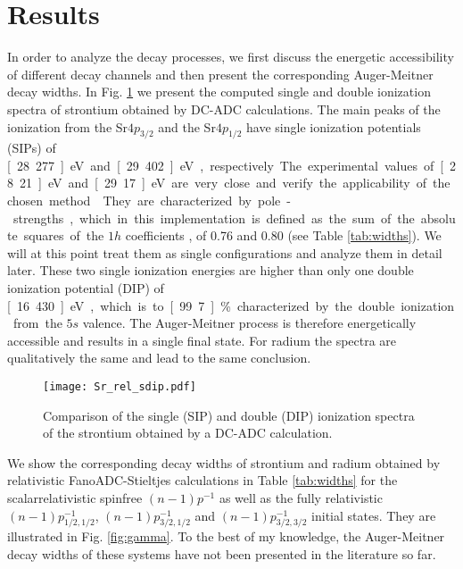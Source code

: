 \section{Results}
\label{section:results}

In order to analyze the decay processes, we first discuss the energetic
accessibility of different decay channels and then present the corresponding
Auger-Meitner decay widths.
In Fig. \ref{fig:sdip} we present the computed
single and double ionization spectra
of strontium obtained by DC-ADC calculations. The main peaks of the
ionization
from the Sr$4p_{3/2}$ and the Sr$4p_{1/2}$ have single ionization potentials (SIPs)
of \unit[28.277]{eV} and \unit[29.402]{eV}, respectively. The experimental
values of \unit[28.21]{eV} and \unit[29.17]{eV} are very close and
{verify}
the applicability
of the chosen method \cite{Schmitz76}.
They are characterized by pole-strengths, which in this implementation
is defined as
the sum of the absolute squares of the $1h$ coefficients
\cite{Trofimov05}, of 0.76 and 0.80
(see Table \ref{tab:widths}). We will at this point treat them as single
configurations and analyze them in detail later.
These two single ionization energies are higher
than only one double ionization potential (DIP) of \unit[16.430]{eV},
which is to \unit[99.7]{\%} characterized by the double ionization from
the $5s$ valence. The Auger-Meitner process is therefore energetically accessible and
results in a single final state.
For radium the spectra are qualitatively the same and
lead to the same conclusion.

\begin{figure}[h]
 \centering
 \texttt{[image: Sr\_rel\_sdip.pdf]}
 \caption{Comparison of the single (SIP) and double (DIP) ionization spectra
          of the strontium obtained by a DC-ADC calculation.}
 \label{fig:sdip}
\end{figure}



We show the corresponding decay
widths of strontium and radium obtained by relativistic FanoADC-Stieltjes
calculations in Table \ref{tab:widths}
for the scalarrelativistic spinfree $(n-1)p^{-1}$ as well as the
fully relativistic $(n-1)p_{1/2,1/2}^{-1}$, $(n-1)p_{3/2,1/2}^{-1}$ and
$(n-1)p_{3/2,3/2}^{-1}$ initial states. They are illustrated in Fig. \ref{fig:gamma}.
To the best of my knowledge, the Auger-Meitner decay widths of these systems have
not been presented in the literature so far.

